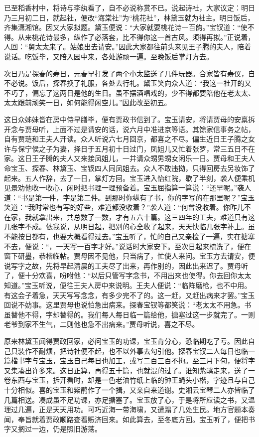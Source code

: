 已至稻香村中，将诗与李纨看了，自不必说称赏不已。说起诗社，大家议定：明日乃三月初二日，就起社，便改``海棠社''为``桃花社''，林黛玉就为社主。明日饭后，齐集潇湘馆。因又大家拟题。黛玉便说：``大家就要桃花诗一百韵。''宝钗道：``使不得。从来桃花诗最多，纵作了必落套，比不得你这一首古风。须得再拟。''正说着，人回：``舅太太来了。姑娘出去请安。''因此大家都往前头来见王子腾的夫人，陪着说话。吃饭毕，又陪入园中来，各处游顽一遍。至晚饭后掌灯方去。

次日乃是探春的寿日，元春早打发了两个小太监送了几件玩器。合家皆有寿仪，自不必说。饭后，探春换了礼服，各处去行礼。黛玉笑向众人道：``我这一社开的又不巧了，偏忘了这两日是他的生日。虽不摆酒唱戏的，少不得都要陪他在老太太、太太跟前顽笑一日，如何能得闲空儿。''因此改至初五。

这日众姊妹皆在房中侍早膳毕，便有贾政书信到了。宝玉请安，将请贾母的安禀拆开念与贾母听，上面不过是请安的话，说六月中准进京等语。其馀家信事务之帖，自有贾琏和王夫人开读。众人听说六七月回京，都喜之不尽。偏生近日王子腾之女许与保宁侯之子为妻，择日于五月初十日过门，凤姐儿又忙着张罗，常三五日不在家。这日王子腾的夫人又来接凤姐儿，一并请众甥男甥女闲乐一日。贾母和王夫人命宝玉、探春、林黛玉、宝钗四人同凤姐去。众人不敢违拗，只得回房去另妆饰了起来。五人作辞，去了一日，掌灯方回。宝玉进入怡红院，歇了半刻，袭人便乘机见景劝他收一收心，闲时把书理一理预备着。宝玉屈指算一算说：``还早呢。''袭人道：``书是第一件，字是第二件。到那时你纵有了书，你的字写的在那里呢？''宝玉笑道：``我时常也有写的好些，难道都没收着？''袭人道：``何曾没收着。你昨儿不在家，我就拿出来，共总数了一数，才有五六十篇。这三四年的工夫，难道只有这几张字不成。依我说，从明日起，把别的心全收了起来，天天快临几张字补上。虽不能按日都有，也要大概看得过去。''宝玉听了，忙的自己又亲检了一遍，实在搪塞不去，便说：``，一天写一百字才好。''说话时大家安下。至次日起来梳洗了，便在窗下研墨，恭楷临帖。贾母因不见他，只当病了，忙使人来问。宝玉方去请安，便说写字之故，先将早起清晨的工夫尽了出来，再作别的，因此出来迟了。贾母听了，便十分欢喜，吩咐他：``以后只管写字念书，不用出来也使得。你去回你太太知道。''宝玉听说，便往王夫人房中来说明。王夫人便说：``临阵磨枪，也不中用。有这会子着急，天天写写念念，有多少完不了的。这一赶，又赶出病来才罢。''宝玉回说不妨事。这里贾母也说怕急出病来。探春宝钗等都笑说：``老太太不用急。书虽替他不得，字却替得的。我们每人每日临一篇给他，搪塞过这一步就完了。一则老爷到家不生气，二则他也急不出病来。''贾母听说，喜之不尽。

原来林黛玉闻得贾政回家，必问宝玉的功课，宝玉肯分心，恐临期吃了亏。因此自己只装作不耐烦，把诗社便不起，也不以外事去勾引他。探春宝钗二人每日也临一篇楷书字与宝玉，宝玉自己每日也加工，或写二百三百不拘。至三月下旬，便将字又集凑出许多来。这日正算，再得五十篇，也就混的过了。谁知紫鹃走来，送了一卷东西与宝玉，拆开看时，却是一色老油竹纸上临的钟王蝇头小楷，字迹且与自己十分相似。喜的宝玉和紫鹃作了一个揖，又亲自来道谢。史湘云宝琴二人亦皆临了几篇相送。凑成虽不足功课，亦足搪塞了。宝玉放了心，于是将所应读之书，又温理过几遍，正是天天用功。可巧近海一带海啸，又遭蹋了几处生民。地方官题本奏闻，奉旨就着贾政顺路查看赈济回来。如此算去，至冬底方回。宝玉听了，便把书字又搁过一边，仍是照旧游荡。

